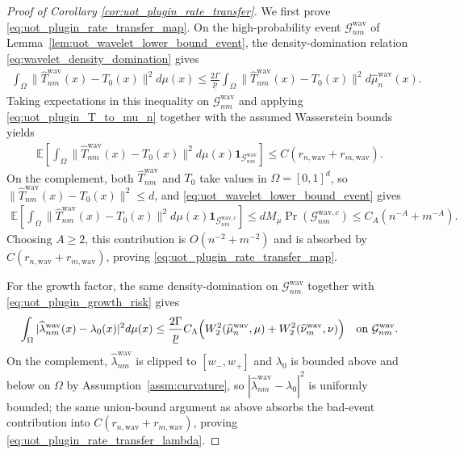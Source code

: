 \documentclass[11pt,reqno]{amsart}
\theoremstyle{definition}
\renewcommand{\hat}{\widehat}
\newcommand{\Ep}{\mathbb{E}}
\begin{document}
\begin{proof}[Proof of Corollary \ref{cor:uot_plugin_rate_transfer}]
We first prove \eqref{eq:uot_plugin_rate_transfer_map}. On the high-probability event $\mathcal G_{nm}^{\mathrm{wav}}$ of Lemma~\ref{lem:uot_wavelet_lower_bound_event}, the density-domination relation \eqref{eq:wavelet_density_domination} gives
\begin{align*}
    \int_{\Omega}\|\hat T_{nm}^{\mathrm{wav}}(x)-T_0(x)\|^2 d\mu(x)
    \le \frac{2\Gamma}{\underline p}
    \int_{\Omega}\|\hat T_{nm}^{\mathrm{wav}}(x)-T_0(x)\|^2 d\hat\mu_n^{\mathrm{wav}}(x).
\end{align*}
Taking expectations in this inequality on $\mathcal G_{nm}^{\mathrm{wav}}$ and applying \eqref{eq:uot_plugin_T_to_mu_n} together with the assumed Wasserstein bounds yields
\begin{align*}
    \Ep\left[
        \int_{\Omega}\|\hat T_{nm}^{\mathrm{wav}}(x)-T_0(x)\|^2 d\mu(x) 
        \mathbf 1_{\mathcal G_{nm}^{\mathrm{wav}}}
    \right]
    \le C(r_{n,\mathrm{wav}}+r_{m,\mathrm{wav}}).
\end{align*}
On the complement, both $\hat T_{nm}^{\mathrm{wav}}$ and $T_0$ take values in $\Omega=[0,1]^d$, so $\|\hat T_{nm}^{\mathrm{wav}}(x)-T_0(x)\|^2\le d$, and \eqref{eq:uot_wavelet_lower_bound_event} gives
\begin{align*}
    \Ep\left[
        \int_{\Omega}\|\hat T_{nm}^{\mathrm{wav}}(x)-T_0(x)\|^2 d\mu(x) 
        \mathbf 1_{\mathcal G_{nm}^{\mathrm{wav},c}}
    \right]
    \le d M_\mu\Pr(\mathcal G_{nm}^{\mathrm{wav},c})
    \le C_A(n^{-A}+m^{-A}).
\end{align*}
Choosing $A\ge 2$, this contribution is $O(n^{-2}+m^{-2})$ and is absorbed by $C(r_{n,\mathrm{wav}}+r_{m,\mathrm{wav}})$, proving \eqref{eq:uot_plugin_rate_transfer_map}.

For the growth factor, the same density-domination on $\mathcal G_{nm}^{\mathrm{wav}}$ together with \eqref{eq:uot_plugin_growth_risk} gives
\begin{align*}
    \int_{\Omega}|\hat\lambda_{nm}^{\mathrm{wav}}(x)-\lambda_0(x)|^2 d\mu(x)
    \le \frac{2\Gamma}{\underline p} 
    C_\Lambda\Bigl(W_2^2(\hat\mu_n^{\mathrm{wav}},\mu)+W_2^2(\hat\nu_m^{\mathrm{wav}},\nu)\Bigr)
    \quad \text{on }\mathcal G_{nm}^{\mathrm{wav}}.
\end{align*}
On the complement, $\hat\lambda_{nm}^{\mathrm{wav}}$ is clipped to $[w_-,w_+]$ and $\lambda_0$ is bounded above and below on $\Omega$ by Assumption~\ref{assm:curvature}, so $|\hat\lambda_{nm}^{\mathrm{wav}}-\lambda_0|^2$ is uniformly bounded; the same union-bound argument as above absorbs the bad-event contribution into $C(r_{n,\mathrm{wav}}+r_{m,\mathrm{wav}})$, proving \eqref{eq:uot_plugin_rate_transfer_lambda}.


\end{proof}
\end{document}
